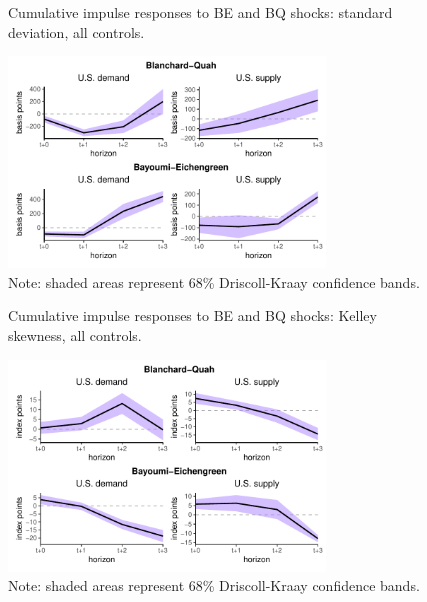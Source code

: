 \documentclass[12pt, a4paper]{article}
\begin{document}
\begin{figure}[H]
    \centering    
    \caption{Cumulative impulse responses to BE and BQ shocks: standard deviation, all controls.}  
    \label{fig:bqbe_std}
    \includegraphics[width=0.75\textwidth]{Figures/robust_std_BQBE_demand_supply_LP.pdf}
    \centering \caption*{Note: shaded areas represent 68\% Driscoll-Kraay confidence bands.}
\end{figure}

\begin{figure}[H]
    \centering    
    \caption{Cumulative impulse responses to BE and BQ shocks: Kelley skewness, all controls.}  
    \label{fig:bqbe_kelley}
    \includegraphics[width=0.75\textwidth]{Figures/robust_kelley_BQBE_demand_supply_LP.pdf}
    \centering \caption*{Note: shaded areas represent 68\% Driscoll-Kraay confidence bands.}
\end{figure}
\end{document}
